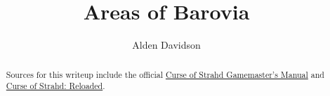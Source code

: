 \documentclass[a4paper,11pt]{article}
\title{Areas of Barovia}
\author{Alden Davidson}
\begin{document}
\maketitle
\tableofcontents

\begin{abstract}
Sources for this writeup include the official \href{https://5e.tools/adventure.html#cos}{Curse of Strahd Gamemaster's Manual} and \href{https://www.reddit.com/r/CurseofStrahd/comments/9bpzbh/curse_of_strahd_reloaded_compilation_thread/}{Curse of Strahd: Reloaded}.
\end{abstract}

\pagebreak
\end{document}
